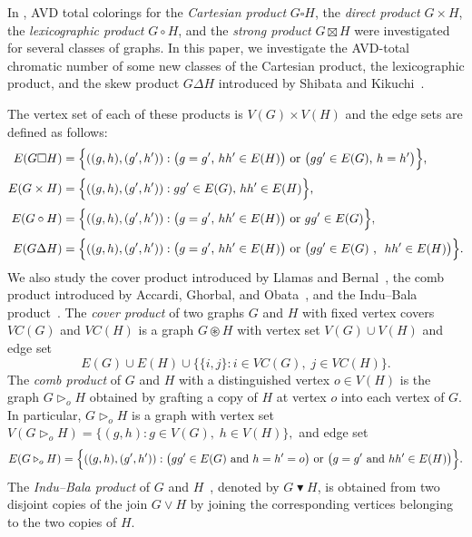 \documentclass[12pt]{article}
\theoremstyle{definition}
\begin{document}
In \cite{BKT2012, TW2015, Wang2017}, AVD total colorings for the 
{\em Cartesian product} $G \square H$, the {\em direct product} $G \times H$, the {\em lexicographic product} $G \circ H$, and the {\em strong product} $G \boxtimes H$ were investigated for several classes of graphs.
In this paper, we investigate the AVD-total chromatic number of some new classes of the Cartesian product, the lexicographic product, and the skew product $G \Delta H$ introduced by Shibata and Kikuchi~\cite{SK2000}.

The vertex set of each of these products is
$V(G)\times V(H)$ and the edge sets are defined as follows:
\begin{align*}
E(G \square H)
&=
\Bigl\{
((g,h),(g',h'))
:
\bigl(g=g' \text{, } hh'\in E(H)\bigr)
\text{ or }
\bigl(gg'\in E(G) \text{, } h=h'\bigr)
\Bigr\},
\\[1mm]
E(G\times H)
&=
\Bigl\{
((g,h),(g',h'))
:
gg'\in E(G)
\text{, }
hh'\in E(H)
\Bigr\},
\\[1mm]
E(G \circ H)
&=
\Bigl\{
((g,h),(g',h'))
:
\bigl(g=g' \text{, } hh'\in E(H)\bigr)
\text{ or }
gg'\in E(G)
\Bigr\},
\\[1mm]
E(G \Delta H)
&=
\Bigl\{
((g,h),(g',h'))
:
\bigl(g=g' \text{,} \ hh'\in E(H)\bigr)
\text{ or }
\bigl(gg'\in E(G) \text{ , } \  hh'\in E(H)\bigr)
\Bigr\}.
\end{align*}
We also study the cover product introduced by Llamas and Bernal~\cite{LB2015}, the comb product introduced by Accardi, Ghorbal, and Obata~\cite{AGO2004}, and the Indu--Bala product~\cite{IB2016}.
The \emph{cover product} of two graphs $G$ and $H$ with fixed vertex covers $VC(G)$ and $VC(H)$ is a graph $G\circledast H$ with vertex set
$
V(G)\cup V(H)
$
and edge set
\[
E(G)\cup E(H)\cup
\bigl\{
\{i,j\}: i\in VC(G),\; j\in VC(H)
\bigr\}.
\]
The \emph{comb product} of $G$ and $H$ \cite{AGO2004, SGV2023} with a distinguished vertex $o\in V(H)$ is the graph $G\triangleright_o H$
obtained by grafting a copy of $H$ at vertex $o$ into each vertex of $G$.
In particular, $G\triangleright_o H$ is a graph with vertex set
$
V(G\triangleright_o H)
=
\{
(g,h): g\in V(G),\; h\in V(H)
\},
$
and edge set
\[
E(G\triangleright_o H)
=
\Bigl\{
((g,h),(g',h'))
:
\bigl(gg'\in E(G) \text{ and } h=h'=o\bigr)
\text{ or }
\bigl(g=g' \text{ and } hh'\in E(H)\bigr)
\Bigr\}.
\]
The \emph{Indu--Bala product} of $G$ and $H$~\cite{IB2016, SGV2023}, denoted by $G\blacktriangledown H$, is obtained from two disjoint copies of the join $G\vee H$ by joining the corresponding vertices belonging to the two copies of $H$.
\end{document}
